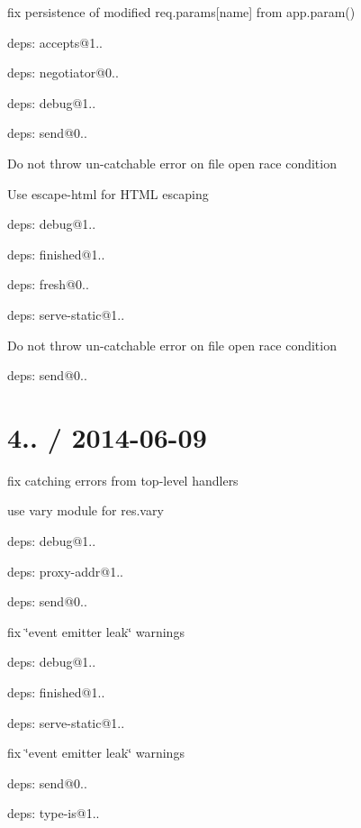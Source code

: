 {\ttfamily 
\begin{DoxyItemize}
\item fix persistence of modified {\ttfamily req.\+params\mbox{[}name\mbox{]}} from {\ttfamily app.\+param()}
\item deps\+: accepts@1..
\begin{DoxyItemize}
\item deps\+: negotiator@0..
\end{DoxyItemize}
\item deps\+: debug@1..
\item deps\+: send@0..
\begin{DoxyItemize}
\item Do not throw un-\/catchable error on file open race condition
\item Use {\ttfamily escape-\/html} for H\+T\+ML escaping
\item deps\+: debug@1..
\item deps\+: finished@1..
\item deps\+: fresh@0..
\end{DoxyItemize}
\item deps\+: serve-\/static@1..
\begin{DoxyItemize}
\item Do not throw un-\/catchable error on file open race condition
\item deps\+: send@0..
\end{DoxyItemize}
\end{DoxyItemize}}

{\ttfamily \section*{4.. / 2014-\/06-\/09 }}

{\ttfamily }

{\ttfamily 
\begin{DoxyItemize}
\item fix catching errors from top-\/level handlers
\item use {\ttfamily vary} module for {\ttfamily res.\+vary}
\item deps\+: debug@1..
\item deps\+: proxy-\/addr@1..
\item deps\+: send@0..
\begin{DoxyItemize}
\item fix \char`\"{}event emitter leak\char`\"{} warnings
\item deps\+: debug@1..
\item deps\+: finished@1..
\end{DoxyItemize}
\item deps\+: serve-\/static@1..
\begin{DoxyItemize}
\item fix \char`\"{}event emitter leak\char`\"{} warnings
\item deps\+: send@0..
\end{DoxyItemize}
\item deps\+: type-\/is@1..
\end{DoxyItemize}}

